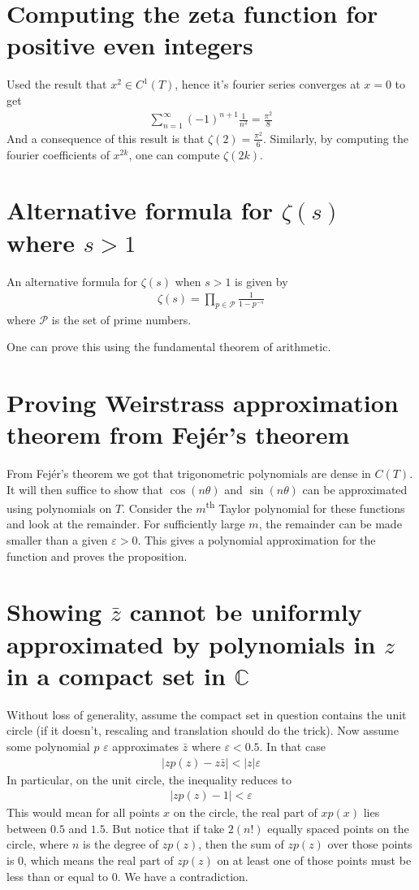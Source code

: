 \documentclass{article}
\begin{document}
\section{Computing the zeta function for positive even integers}
Used the result that $x^2 \in C^1(T)$, hence it's fourier series converges at $x=0$ to get
\begin{align*}
    \sum_{n=1}^{\infty} (-1)^{n+1}\frac{1}{n^2} = \frac{\pi^2}{8}
\end{align*}
And a consequence of this result is that $\zeta(2) = \frac{\pi^2}{6}$. Similarly, by computing the fourier coefficients of $x^{2k}$, one can compute $\zeta(2k)$.

\section{Alternative formula for $\zeta(s)$ where $s > 1$}
An alternative formula for $\zeta(s)$ when $s>1$ is given by
\begin{align*}
    \zeta(s) = \prod_{p \in \mathcal{P}} \frac{1}{1 - p^{-s}}
\end{align*}
where $\mathcal{P}$ is the set of prime numbers.

One can prove this using the fundamental theorem of arithmetic.

\section{Proving Weirstrass approximation theorem from Fejér's theorem}
From Fejér's theorem we got that trigonometric polynomials are dense in $C(T)$. It will then suffice to show that $\cos(n\theta)$ and $\sin(n\theta)$ can be approximated using polynomials on $T$. Consider the $m$\textsuperscript{th} Taylor polynomial for these functions and look at the remainder. For sufficiently large $m$, the remainder can be made smaller than a given $\varepsilon > 0$. This gives a polynomial approximation for the function and proves the proposition.

\section{Showing $\bar{z}$ cannot be uniformly approximated by polynomials in $z$ in a compact set in $\mathbb{C}$}
Without loss of generality, assume the compact set in question contains the unit circle (if it doesn't, rescaling and translation should do the trick). Now assume some polynomial $p$ $\varepsilon$ approximates $\bar{z}$ where $\varepsilon < 0.5$. In that case
\begin{align*}
    |zp(z) - z\bar{z}| < |z|\varepsilon
\end{align*}
In particular, on the unit circle, the inequality reduces to
\begin{align*}
    |zp(z) - 1| < \varepsilon
\end{align*}
This would mean for all points $x$ on the circle, the real part of $xp(x)$ lies between $0.5$ and $1.5$. But notice that if take $2(n!)$ equally spaced points on the circle, where $n$ is the degree of $zp(z)$, then the sum of $zp(z)$ over those points is $0$, which means the real part of $zp(z)$ on at least one of those points must be less than or equal to $0$. We have a contradiction.
\end{document}
